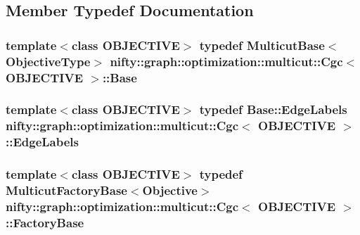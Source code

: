\subsection{Member Typedef Documentation}
\hypertarget{classnifty_1_1graph_1_1optimization_1_1multicut_1_1Cgc_acdde87de7bae598ab55182ef49cbf979}{}
\subsubsection[{Base}]{\setlength{\rightskip}{0pt plus 5cm}template$<$class O\+B\+J\+E\+C\+T\+I\+V\+E$>$ typedef {\bf Multicut\+Base}$<${\bf Objective\+Type}$>$ {\bf nifty\+::graph\+::optimization\+::multicut\+::\+Cgc}$<$ O\+B\+J\+E\+C\+T\+I\+V\+E $>$\+::{\bf Base}}\label{classnifty_1_1graph_1_1optimization_1_1multicut_1_1Cgc_acdde87de7bae598ab55182ef49cbf979}
\hypertarget{classnifty_1_1graph_1_1optimization_1_1multicut_1_1Cgc_ab48f3649332fb4161baf8de03810dcce}{}
\subsubsection[{Edge\+Labels}]{\setlength{\rightskip}{0pt plus 5cm}template$<$class O\+B\+J\+E\+C\+T\+I\+V\+E$>$ typedef {\bf Base\+::\+Edge\+Labels} {\bf nifty\+::graph\+::optimization\+::multicut\+::\+Cgc}$<$ O\+B\+J\+E\+C\+T\+I\+V\+E $>$\+::{\bf Edge\+Labels}}\label{classnifty_1_1graph_1_1optimization_1_1multicut_1_1Cgc_ab48f3649332fb4161baf8de03810dcce}
\hypertarget{classnifty_1_1graph_1_1optimization_1_1multicut_1_1Cgc_a6fd09058a2a520decf479f6cd339b057}{}
\subsubsection[{Factory\+Base}]{\setlength{\rightskip}{0pt plus 5cm}template$<$class O\+B\+J\+E\+C\+T\+I\+V\+E$>$ typedef {\bf Multicut\+Factory\+Base}$<${\bf Objective}$>$ {\bf nifty\+::graph\+::optimization\+::multicut\+::\+Cgc}$<$ O\+B\+J\+E\+C\+T\+I\+V\+E $>$\+::{\bf Factory\+Base}}\label{classnifty_1_1graph_1_1optimization_1_1multicut_1_1Cgc_a6fd09058a2a520decf479f6cd339b057}
\hypertarget{classnifty_1_1graph_1_1optimization_1_1multicut_1_1Cgc_a4737d533c9d4d62c220bb81f5acba0fe}{}
